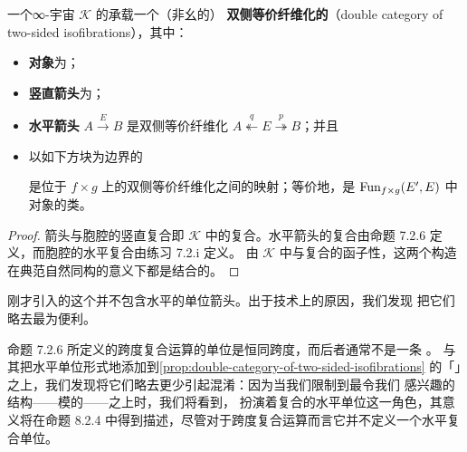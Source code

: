 \begin{proposition}%
\label{prop:double-category-of-two-sided-isofibrations}
一个∞-宇宙 $\mathcal{K}$ 的\trHomotopyTwoCategory{}承载一个（非幺的）%
\textbf{双侧等价纤维化的\trDoubleCategory}（double category of two-sided
isofibrations），其中：
\begin{itemize}
\item \textbf{对象}为\trInfinityCategories{}；
\item \textbf{竖直箭头}为\trFunctor{}；
\item \textbf{水平箭头} $A\xrightarrow{E}B$ 是双侧等价纤维化
$A\overset{q}{\twoheadleftarrow}E\overset{p}{\twoheadrightarrow}B$；并且
\item 以如下方块为边界的\textbf{\trCell}
\begin{center}
\end{center}
是位于 $f\times g$ 上的双侧等价纤维化之间的映射；等价地，是\trQuasiCategory%
$\operatorname{Fun}_{f\times g}(E',E)$ 中对象的\trIsomorphism{}类。
\end{itemize}
\end{proposition}

\begin{proof}
箭头与胞腔的竖直复合即 $\mathcal{K}$ 中的复合。水平箭头的复合由命题 7.2.6
定义，而胞腔的水平复合由练习 7.2.i 定义。
由 $\mathcal{K}$ 中\trPullback{}与复合的\trSimplicial{}函子性，这两个构造
在典范自然同构的意义下都是结合的。
\end{proof}

刚才引入的这个\trDoubleCategory{}并不包含水平的单位箭头。出于技术上的原因，我们发现
把它们略去最为便利。

\begin{remark}[水平单位为何缺席]\label{rem:missing-horizontal-unit}
命题 7.2.6 所定义的跨度复合运算的单位是恒同跨度，而后者通常不是一条%
\trTwoSidedIsofibration{}。
与其把水平单位形式地添加到\cref{prop:double-category-of-two-sided-isofibrations}
的「\trDoubleCategory」之上，我们发现将它们略去更少引起混淆：因为当我们限制到最令我们
感兴趣的结构——模的\trVirtualEquipment——之上时，我们将看到，%
\trArrowInfinityCategory{}扮演着复合的水平单位这一角色，其意义将在命题
8.2.4 中得到描述，尽管对于跨度复合运算而言它并不定义一个水平复合单位。
\end{remark}

